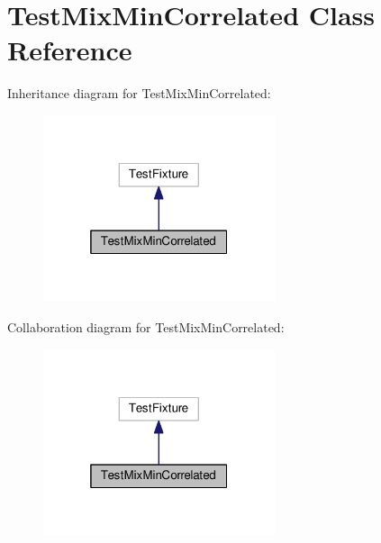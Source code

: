 \hypertarget{class_test_mix_min_correlated}{}\section{Test\+Mix\+Min\+Correlated Class Reference}
\label{class_test_mix_min_correlated}


Inheritance diagram for Test\+Mix\+Min\+Correlated\+:
\nopagebreak
\begin{figure}[H]
\begin{center}
\leavevmode
\includegraphics[width=193pt]{class_test_mix_min_correlated__inherit__graph}
\end{center}
\end{figure}


Collaboration diagram for Test\+Mix\+Min\+Correlated\+:
\nopagebreak
\begin{figure}[H]
\begin{center}
\leavevmode
\includegraphics[width=193pt]{class_test_mix_min_correlated__coll__graph}
\end{center}
\end{figure}
